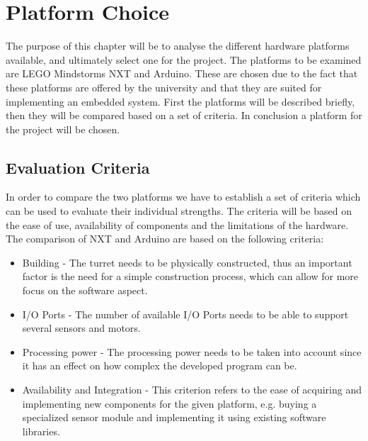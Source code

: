 \chapter{Platform Choice}\label{PlatformC}
The purpose of this chapter will be to analyse the different hardware platforms
available, and ultimately select one for the project. The platforms to be
examined are LEGO Mindstorms NXT and Arduino. These are chosen due to the fact
that these platforms are offered by the university and that they are suited for
implementing an embedded system. First the platforms will be described briefly,
then they will be compared based on a set of criteria. In conclusion a platform
for the project will be chosen.

\section{Evaluation Criteria}\label{EvalCrit}
In order to compare the two platforms we have to establish a set of criteria
which can be used to evaluate their individual strengths. The criteria
will be based on the ease of use, availability of components and the limitations
of the hardware. The comparison of NXT and Arduino are based on the following
criteria:

\begin{itemize}
  \item Building - The turret needs to be physically constructed, thus an
  important factor is the need for a simple construction process, which can
  allow for more focus on the software aspect.
  \item I/O Ports - The number of available I/O Ports needs to be able to
  support several sensors and motors.
  \item Processing power - The processing power needs to be taken into account
  since it has an effect on how complex the developed program can be.
  \item Availability and Integration - This criterion refers to the ease of
  acquiring and implementing new components for the given platform, e.g. buying
  a specialized sensor module and implementing it using existing software
  libraries.
\end{itemize}

